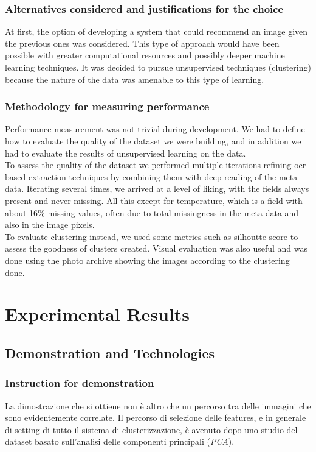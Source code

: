 \documentclass[12pt,a4paper,twoside]{article}
\begin{document}
\subsubsection{Alternatives considered and justifications for the choice}
At first, the option of developing a system that could recommend an image given the previous ones was considered. This type of approach would have been possible with greater computational resources and possibly deeper machine learning techniques. It was decided to pursue unsupervised techniques (clustering) because the nature of the data was amenable to this type of learning.  

\subsubsection{Methodology for measuring performance}
Performance measurement was not trivial during development. We had to define how to evaluate the quality of the dataset we were building, and in addition we had to evaluate the results of unsupervised learning on the data. \\ To assess the quality of the dataset we performed multiple iterations refining ocr-based extraction techniques by combining them with deep reading of the meta-data. Iterating several times, we arrived at a level of liking, with the fields always present and never missing. All this except for temperature, which is a field with about 16\% missing values, often due to total missingness in the meta-data and also in the image pixels. \\ To evaluate clustering instead, we used some metrics such as silhoutte-score to assess the goodness of clusters created. Visual evaluation was also useful and was done using the photo archive showing the images according to the clustering done.

\section{Experimental Results}

\subsection{Demonstration and Technologies}

\subsubsection{Instruction for demonstration}
La dimostrazione che si ottiene non è altro che un percorso tra delle immagini che sono 
evidentemente correlate. Il percorso di selezione delle features, e in generale di setting di 
tutto il sistema di clusterizzazione, è avenuto dopo uno studio del dataset basato 
sull'analisi delle componenti principali (\textit{PCA}).\\ 
\end{document}
